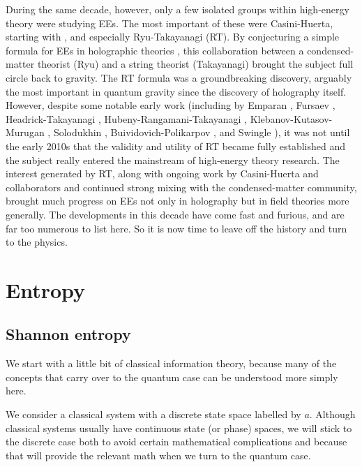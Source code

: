 \documentclass[11pt]{article}
\begin{document}
During the same decade, however, only a few isolated groups within high-energy theory were studying EEs. The most important of these were Casini-Huerta, starting with \cite{Casini:2003ix}, and especially Ryu-Takayanagi (RT). By conjecturing a simple formula for EEs in holographic theories \cite{Ryu:2006bv,Ryu:2006ef}, this collaboration between a condensed-matter theorist (Ryu) and a string theorist (Takayanagi) brought the subject full circle back to gravity. The RT formula was a groundbreaking discovery, arguably the most important in quantum gravity since the discovery of holography itself. However, despite some notable early work (including by Emparan \cite{Emparan:2006ni}, Fursaev \cite{Fursaev:2006ih}, Headrick-Takayanagi \cite{Headrick:2007km}, Hubeny-Rangamani-Takayanagi \cite{Hubeny:2007xt}, Klebanov-Kutasov-Murugan \cite{Klebanov:2007ws}, Solodukhin \cite{Solodukhin:2008dh}, Buividovich-Polikarpov \cite{Buividovich:2008gq}, and Swingle \cite{Swingle:2009bg}), it was not until the early 2010s that the validity and utility of RT became fully established and the subject really entered the mainstream of high-energy theory research. The interest generated by RT, along with ongoing work by Casini-Huerta and collaborators and continued strong mixing with the condensed-matter community, brought much progress on EEs not only in holography but in field theories more generally. The developments in this decade have come fast and furious, and are far too numerous to list here. So it is now time to leave off the history and turn to the physics.



\section{Entropy}
\label{sec:1}


\subsection{Shannon entropy}

We start with a little bit of classical information theory, because many of the concepts that carry over to the quantum case can be understood more simply here.

We consider a classical system with a discrete state space labelled by $a$. Although classical systems usually have continuous state (or phase) spaces, we will stick to the discrete case both to avoid certain mathematical complications and because that will provide the relevant math when we turn to the quantum case.
\end{document}
